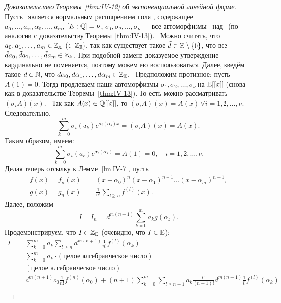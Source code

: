 \begin{proof}[Доказательство Теоремы~\ref{thm:IV-12} об экспоненциальной линейной форме]
\vfill
    Пусть \EE~является нормальным расширением поля \QQ, содержащее $a_0, \dots, a_m, \alpha_0, \dots, \alpha_m$, $[E : \mathbb{Q}] = \nu$, $\sigma_1, \sigma_2, \dots, \sigma_\nu$ --- все автоморфизмы \EE~над \QQ~(по аналогии с доказательству Теоремы~\ref{thm:IV-13}).~\newline
    Можно считать, что $a_0, a_1, \dots, a_m \in \mathbb{Z}_{\mathbb{A}}$ $(\in \mathbb{Z}_{\mathbb{E}})$, так как существует такое $\tilde{d} \in \mathbb{Z} \setminus \{ 0 \}$, что все $\tilde{d}a_0, \tilde{d}a_1, \dots, \tilde{d}a_m \in \mathbb{Z}_{\mathbb{A}}$. При подобной замене доказуемое утверждение кардинально не поменяется, поэтому можем ею воспользоваться. Далее, введём такое $d \in \mathbb{N}$, что $d\alpha_0, d\alpha_1, \dots, d\alpha_m \in \mathbb{Z}_{\mathbb{E}}$.~\newline
    Предположим противное: пусть $A(1) = 0$. Тогда продлеваем наши автоморфизмы $\sigma_1, \sigma_2, \dots, \sigma_\nu$ на $\mathbb{E}[[x]]$ (снова как в доказательстве Теоремы~\ref{thm:IV-13}). То есть можно рассматривать $\left( \sigma_iA \right)(x)$.~\newline
    Так как $A(x) \in \mathbb{Q}[[x]]$, то $\left( \sigma_iA \right)(x) = A(x) \ \forall i = 1, 2, \dots, \nu$. Следовательно, 
    \[
        \sum_{k=0}^m \sigma_i \left(a_k\right) e^{\sigma_i(\alpha_k)x} = (\sigma_iA)(x) = A(x).
    \]
    Таким образом, имеем:
    \[
        \sum_{k=0}^m \sigma_i\left(a_k\right)e^{\sigma_i\left(\alpha_k\right)} = A(1) = 0, \quad i = 1, 2, \dots, \nu.
    \]
    Делая теперь отсылку к Лемме~\ref{lm:IV-7}, пусть
    \begin{align*}
        f(x) = f_n(x) &= \left(x-\alpha_0\right)^n \left(x-\alpha_1\right)^{n+1} \dots \left(x-\alpha_m\right)^{n+1}, \\
        g(x) = g_n(x) &= \frac{1}{n!} \sum_{l \ge n} f^{(l)}(x).
    \end{align*} 
    Далее, положим
    \[
        I = I_n = d^{m(n+1)} \sum_{k=0}^m a_k g\left(\alpha_k\right).
    \]
    Продемонстрируем, что $I \in \mathbb{Z}_{\mathbb{E}}$ (очевидно, что $I \in \mathbb{E}$):
    \begin{align*}
        I &= \sum_{k=0}^m a_k \sum_{l \ge n} d^{m(n+1)}\frac{1}{n!}f^{(l)}\left(\alpha_k\right) \\
        &= \sum_{k=0}^m a_k \cdot (\text{целое алгебраическое число}) \\
        &= (\text{целое алгебраическое число}) \\
        &= d^{m(n+1)}a_0\frac{1}{n!}f^{(n)}\left(\alpha_0\right) + (n+1)\sum_{k=0}^m \sum_{l \ge n+1} a_k \frac{l!}{(n+1)!}d^{m(n+1)} \frac{1}{l!} f^{(l)}\left(\alpha_k\right) \\

\end{align*}
\end{proof}
